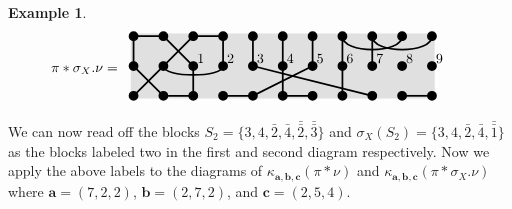 \documentclass[10pt]{amsart}
\theoremstyle{definition}
\theoremstyle{definition}
\newtheorem{exam}[exam]{Example}
\theoremstyle{plain}
\theoremstyle{remark}
\theoremstyle{plain}
\theoremstyle{plain}
\newcommand{\bfa}{{\boldsymbol{a}}}
\newcommand{\bfb}{{\boldsymbol{b}}}
\newcommand{\bfc}{{\boldsymbol{c}}}
\newcommand{\ov}[1]{\bar{#1}}
\newcommand{\ovov}[1]{\bar{\bar{#1}}}
\newcommand{\colortop}[2]{\foreach \i in {#1}  {\filldraw[fill=#2,draw=#2,line width = 1pt] (T\i) circle (4pt);}}
\newcommand{\colormid}[2]{\foreach \i in {#1}  {\filldraw[fill=#2,draw=#2,line width = 1pt] (M\i) circle (4pt);}}
\newcommand{\colorbot}[2]{\foreach \i in {#1}  {\filldraw[fill=#2,draw=#2,line width = 1pt] (B\i) circle (4pt);}}
\begin{document}
\begin{exam}
\begin{align*}
    \pi\ast\sigma_X.\nu&=\begin{array}{c}
            \begin{tikzpicture}[xscale=.75,yscale=.75,line width=1.25pt] 
                \foreach \i in {1,2,3,4,5,6,7,8,9,10,11}  { \path (\i,1.25) coordinate (T\i); \path (\i,.25) coordinate (M\i); \path (\i,-.75) coordinate (B\i); } 
                \filldraw[fill= black!12,draw=black!12,line width=4pt]  (T1) -- (T11) -- (B11) -- (B1) -- (T1);
                \draw[black] (M1)--(T1)--(T2)--(M3);
                \draw[black] (M2)--(T3)--(T4)--(M4);
                \draw[black] (T5)--(M5);
                \draw[black] (T6)--(M6);
                \draw[black] (T7)--(M7);
                \draw[black] (M8)--(T8) .. controls +(0,-0.6) and +(0,-0.6) .. (T10);
                \draw[black] (M9)--(T9) .. controls +(0,-0.6) and +(0,-0.6) .. (T11);
                \draw[black] (B1)--(M2) .. controls +(0,-0.4) and +(0,-0.4) .. (M4);
                \draw[black] (M1)--(B2)--(B3)--(M3);
                \draw[black] (M7)--(B5)--(B4);
                \draw[black] (M6)--(B6)--(B7);
                \draw[black] (M8)--(B8);
                \draw[black] (M5)--(B9);
                \draw[black] (B10)--(B11);
                \colortop{1,2,3,4,5,6,7,8,9,10,11}{black}
                \colormid{1,2,3,4,5,6,7,8,9,10,11}{black}
                \colorbot{1,2,3,4,5,6,7,8,9,10,11}{black}
                \node at (3.25,.5) {1};
                \node at (4.25,.5) {2};
                \node at (5.25,.5) {3};
                \node at (6.25,.5) {4};
                \node at (7.25,.5) {5};
                \node at (8.25,.5) {6};
                \node at (9.25,.5) {7};
                \node at (10.25,.5) {8};
                \node at (11.25,.5) {9};
            \end{tikzpicture}
        \end{array}
\end{align*}

We can now read off the blocks $S_2=\{3,4,\ov2,\ov4,\ovov2,\ovov3\}$ and $\sigma_X(S_2)=\{3,4,\ov2,\ov4,\ovov1\}$ as the blocks labeled two in the first and second diagram respectively. Now we apply the above labels to the diagrams of $\kappa_{\bfa,\bfb,\bfc}(\pi\ast\nu)$ and $\kappa_{\bfa,\bfb,\bfc}(\pi\ast \sigma_X.\nu)$ where $\bfa=(7,2,2)$, $\bfb=(2,7,2)$, and $\bfc=(2,5,4)$.


\end{exam}
\end{document}
